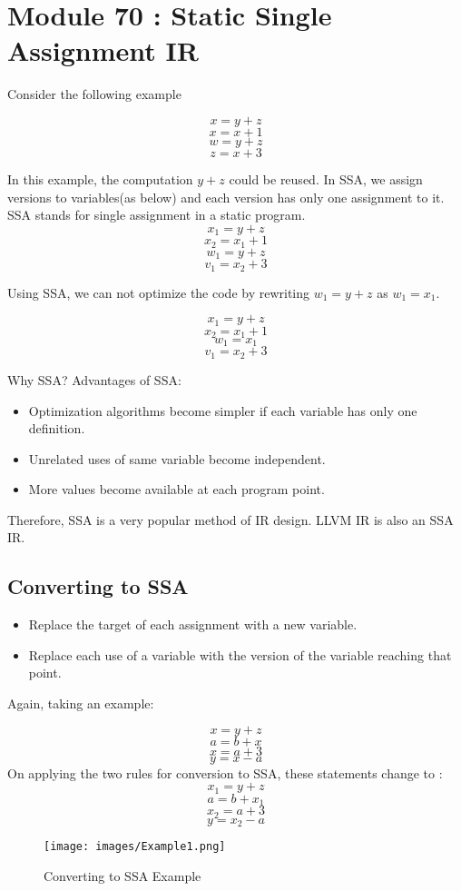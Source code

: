 \section{Module 70 : Static Single Assignment IR}
Consider the following example

    \[x = y+z\]
    \[x = x+1\]
    \[w=y+z\]
    \[z=x+3\]
    
In this example, the computation $y+z$ could be reused.
In SSA, we assign versions to variables(as below) and each version has only one assignment to it. SSA stands for single assignment in a static program. 
    \[x_1 = y+z\]
    \[x_2 = x_1+1\]
    \[w_1=y+z\]
    \[v_1=x_2+3\]
    
Using SSA, we can not optimize the code by rewriting $w_1 = y+z$ as $w_1 = x_1$.

    \[x_1 = y+z\]
    \[x_2 = x_1+1\]
    \[w_1=x_1\]
    \[v_1=x_2+3\]
    
Why SSA? Advantages of SSA:
\begin{itemize}
    \item Optimization algorithms become simpler if each variable has only one definition.
    \item Unrelated uses of same variable become independent.
    \item More values become available at each program point.
\end{itemize}
Therefore, SSA is a very popular method of IR design. LLVM IR is also an SSA IR.

\subsection{Converting to SSA}
\begin{itemize}
    \item Replace the target of each assignment with a new variable.
    \item Replace each use of a variable with the version of the variable reaching that point.
\end{itemize}
Again, taking an example:

    \[x = y+z\]
    \[a = b+x\]
    \[x=a+3\]
    \[y=x-a\]
On applying the two rules for conversion to SSA, these statements change to :
     \[x_1 = y+z\]
    \[a = b+x_1\]
    \[x_2=a+3\]
    \[y=x_2-a\]
    

\begin{figure*}
\centering
\texttt{[image: images/Example1.png]}
\caption{Converting to SSA Example}
\end{figure*}

